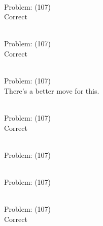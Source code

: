 \documentclass[11pt]{article}
\begin{document}
\begin{minipage}[t]{0.5\textwidth}
  {\centering
  
\\
Problem: (107)\\
Correct\\
  }
\end{minipage}
\begin{minipage}[t]{0.5\textwidth}
  {\centering
  
\\
Problem: (107)\\
Correct\\
  }
\end{minipage}
\begin{minipage}[t]{0.5\textwidth}
  {\centering
  
\\
Problem: (107)\\
There's a better move for this.\\
  }
\end{minipage}
\begin{minipage}[t]{0.5\textwidth}
  {\centering
  
\\
Problem: (107)\\
Correct\\
  }
\end{minipage}
\begin{minipage}[t]{0.5\textwidth}
  {\centering
  
\\
Problem: (107)\\
  }
\end{minipage}
\begin{minipage}[t]{0.5\textwidth}
  {\centering
  
\\
Problem: (107)\\
  }
\end{minipage}
\begin{minipage}[t]{0.5\textwidth}
  {\centering
  
\\
Problem: (107)\\
Correct\\
  }
\end{minipage}
\end{document}
